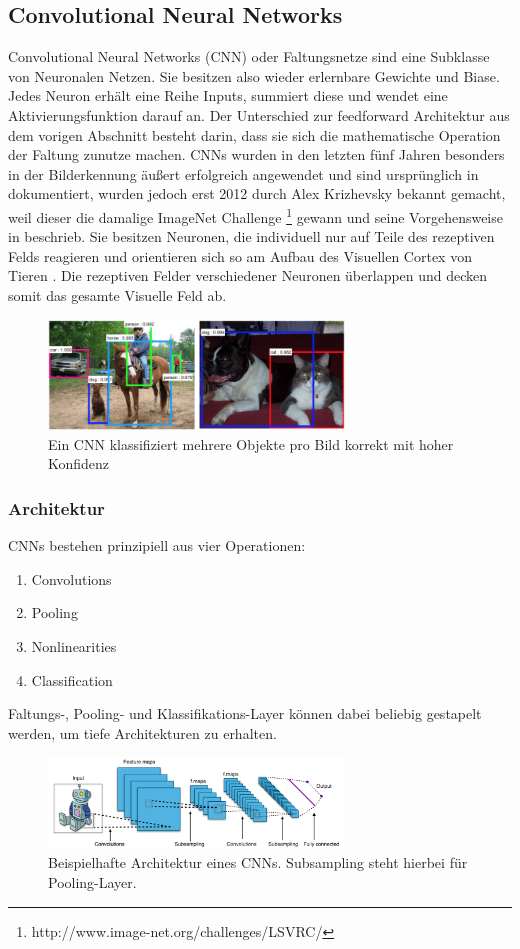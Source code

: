 \subsection{Convolutional Neural Networks}
Convolutional Neural Networks (CNN) oder Faltungsnetze sind eine Subklasse von Neuronalen Netzen. Sie besitzen also wieder erlernbare Gewichte und Biase. Jedes Neuron erhält eine Reihe Inputs, summiert diese und wendet eine Aktivierungsfunktion darauf an. Der Unterschied zur feedforward Architektur aus dem vorigen Abschnitt besteht darin, dass sie sich die mathematische Operation der Faltung zunutze machen. CNNs wurden in den letzten fünf Jahren besonders in der Bilderkennung äußert erfolgreich angewendet und sind ursprünglich in \cite{lecun1998gradient} dokumentiert, wurden jedoch erst 2012 durch Alex Krizhevsky bekannt gemacht, weil dieser die damalige ImageNet Challenge \footnote{http://www.image-net.org/challenges/LSVRC/} gewann und seine Vorgehensweise in \cite{krizhevsky2012imagenet} beschrieb. Sie besitzen Neuronen, die individuell nur auf Teile des rezeptiven Felds reagieren und orientieren sich so am Aufbau des Visuellen Cortex von Tieren \cite{matsugu2003subject}. Die rezeptiven Felder verschiedener Neuronen überlappen und decken somit das gesamte Visuelle Feld ab. 
\begin{figure}[h!] 
	\centering
	\includegraphics[width=0.7\textwidth]{abb/classification.png}
	\caption{Ein CNN klassifiziert mehrere Objekte pro Bild korrekt mit hoher Konfidenz}
	\label{https://arxiv.org/pdf/1506.01497v3.pdf}
\end{figure}
\subsubsection{Architektur}
CNNs bestehen prinzipiell aus vier Operationen:
\begin{enumerate}
	\item Convolutions
	\item Pooling
	\item Nonlinearities
	\item Classification
\end{enumerate}
Faltungs-, Pooling- und Klassifikations-Layer können dabei beliebig gestapelt werden, um tiefe Architekturen zu erhalten. 
\begin{figure}[h!] 
	\centering
	\includegraphics[width=0.7\textwidth]{abb/cnnwp.png}
	\caption{Beispielhafte Architektur eines CNNs. Subsampling steht hierbei für Pooling-Layer.}
	\label{fig1}
\end{figure}
\clearpage
